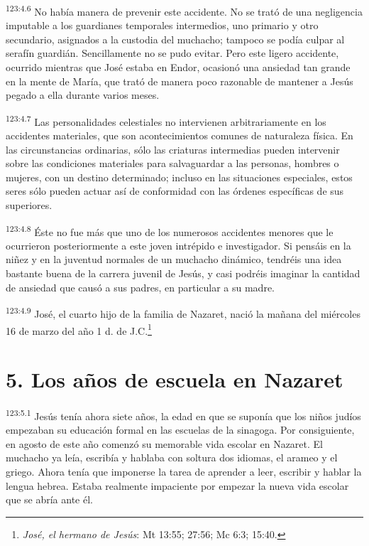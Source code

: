 \par
\textsuperscript{123:4.6} No había manera de prevenir este accidente. No se trató de una negligencia imputable a los guardianes temporales intermedios, uno primario y otro secundario, asignados a la custodia del muchacho; tampoco se podía culpar al serafín guardián. Sencillamente no se pudo evitar. Pero este ligero accidente, ocurrido mientras que José estaba en Endor, ocasionó una ansiedad tan grande en la mente de María, que trató de manera poco razonable de mantener a Jesús pegado a ella durante varios meses.

\par
\textsuperscript{123:4.7} Las personalidades celestiales no intervienen arbitrariamente en los accidentes materiales, que son acontecimientos comunes de naturaleza física. En las circunstancias ordinarias, sólo las criaturas intermedias pueden intervenir sobre las condiciones materiales para salvaguardar a las personas, hombres o mujeres, con un destino determinado; incluso en las situaciones especiales, estos seres sólo pueden actuar así de conformidad con las órdenes específicas de sus superiores.

\par
\textsuperscript{123:4.8} Éste no fue más que uno de los numerosos accidentes menores que le ocurrieron posteriormente a este joven intrépido e investigador. Si pensáis en la niñez y en la juventud normales de un muchacho dinámico, tendréis una idea bastante buena de la carrera juvenil de Jesús, y casi podréis imaginar la cantidad de ansiedad que causó a sus padres, en particular a su madre.

\par
\textsuperscript{123:4.9} José, el cuarto hijo de la familia de Nazaret, nació la mañana del miércoles 16 de marzo del año 1 d. de J.C.\footnote{\textit{José, el hermano de Jesús}: Mt 13:55; 27:56; Mc 6:3; 15:40.}

\section*{5. Los años de escuela en Nazaret}
\par
\textsuperscript{123:5.1} Jesús tenía ahora siete años, la edad en que se suponía que los niños judíos empezaban su educación formal en las escuelas de la sinagoga. Por consiguiente, en agosto de este año comenzó su memorable vida escolar en Nazaret. El muchacho ya leía, escribía y hablaba con soltura dos idiomas, el arameo y el griego. Ahora tenía que imponerse la tarea de aprender a leer, escribir y hablar la lengua hebrea. Estaba realmente impaciente por empezar la nueva vida escolar que se abría ante él.

